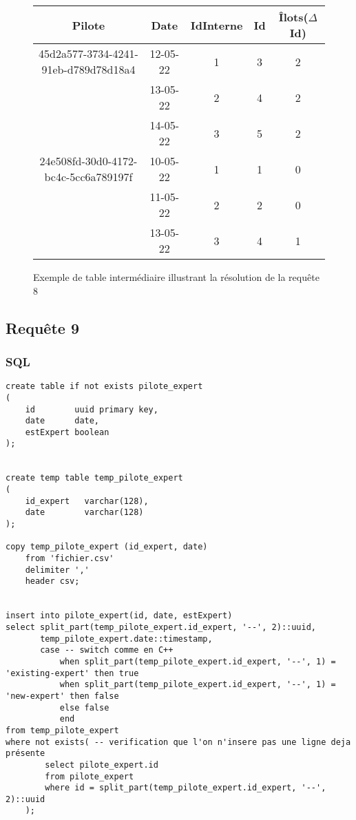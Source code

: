 \documentclass[french, utf8]{article}
\begin{document}
\begin{figure}[H]
\begin{center}
    \begin{tabular}{|c|c|c|c|c|}
        \hline
        Pilote & Date & IdInterne & Id & Îlots($\Delta$Id)\\

        \hline
        45d2a577-3734-4241-91eb-d789d78d18a4 & 12-05-22 & 1 & 3 & 2 \\
        & 13-05-22 & 2 & 4 & 2\\
        & 14-05-22 & 3 & 5 & 2\\
        \hline
        24e508fd-30d0-4172-bc4c-5cc6a789197f & 10-05-22 & 1 & 1 & 0 \\
        & 11-05-22 & 2 & 2 & 0 \\
        & 13-05-22 & 3 & 4 & 1 \\
        \hline
    \end{tabular}
\end{center}
    \caption{Exemple de table intermédiaire illustrant la résolution de la requête 8}
    \label{fig:requete8}
\end{figure}


\newpage

\subsection{Requête 9}
\subsubsection{SQL}

\begin{verbatim}
create table if not exists pilote_expert
(
    id        uuid primary key,
    date      date,
    estExpert boolean
);


create temp table temp_pilote_expert
(
    id_expert   varchar(128),
    date        varchar(128)
);

copy temp_pilote_expert (id_expert, date)
    from 'fichier.csv'
    delimiter ','
    header csv;


insert into pilote_expert(id, date, estExpert)
select split_part(temp_pilote_expert.id_expert, '--', 2)::uuid,
       temp_pilote_expert.date::timestamp,
       case -- switch comme en C++
           when split_part(temp_pilote_expert.id_expert, '--', 1) = 'existing-expert' then true
           when split_part(temp_pilote_expert.id_expert, '--', 1) = 'new-expert' then false
           else false
           end
from temp_pilote_expert
where not exists( -- verification que l'on n'insere pas une ligne deja présente
        select pilote_expert.id
        from pilote_expert
        where id = split_part(temp_pilote_expert.id_expert, '--', 2)::uuid
    );

\end{verbatim}
\newpage
\end{document}
